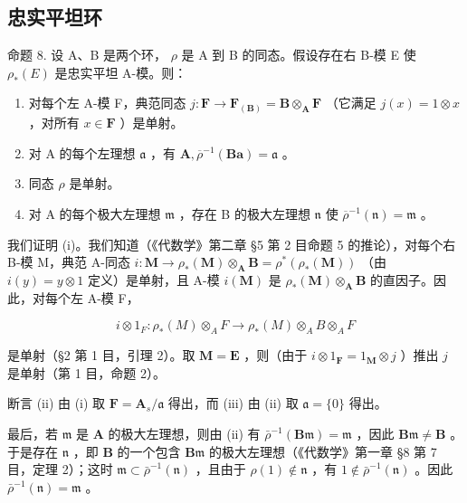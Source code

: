 \subsection{忠实平坦环}

命题 8. 设 A、B 是两个环， \(\rho\) 是 A 到 B 的同态。假设存在右 B-模 E 使 \(\rho_{*}(E)\) 是忠实平坦 A-模。则：

\begin{enumerate}
\def\labelenumi{(\roman{enumi})}
\item
  对每个左 A-模 F，典范同态 \(j: \mathbf{F} \to \mathbf{F}_{(\mathbf{B})} = \mathbf{B} \otimes_{\mathbf{A}} \mathbf{F}\) （它满足 \(j(x) = 1 \otimes x\) ，对所有 \(x \in \mathbf{F}\) ）是单射。
\item
  对 A 的每个左理想 \(\mathfrak{a}\) ，有 \(\mathbf{A},\overline{\rho}^{-1}(\mathbf{Ba}) = \mathfrak{a}\) 。
\item
  同态 \(\rho\) 是单射。
\item
  对 A 的每个极大左理想 \(\mathfrak{m}\) ，存在 B 的极大左理想 \(\mathfrak{n}\) 使 \(\overline{\rho}^{-1}(\mathfrak{n}) = \mathfrak{m}\) 。
\end{enumerate}

我们证明 (i)。我们知道（《代数学》第二章 §5 第 2 目命题 5 的推论），对每个右 B-模 M，典范 A-同态 \(i: \mathbf{M} \to \rho_*(\mathbf{M}) \otimes_{\mathbf{A}} \mathbf{B} = \rho^*(\rho_*(\mathbf{M}))\) （由 \(i(y) = y \otimes 1\) 定义）是单射，且 A-模 \(i(\mathbf{M})\) 是 \(\rho_*(\mathbf{M}) \otimes_{\mathbf{A}} \mathbf{B}\) 的直因子。因此，对每个左 A-模 F，

\[
i \otimes 1 _ {F}: \rho_ {*} (M) \otimes_ {A} F \rightarrow \rho_ {*} (M) \otimes_ {A} B \otimes_ {A} F
\]

是单射（§2 第 1 目，引理 2）。取 \(\mathbf{M} = \mathbf{E}\) ，则（由于 \(i \otimes 1_{\mathbf{F}} = 1_{\mathbf{M}} \otimes j\) ）推出 \(j\) 是单射（第 1 目，命题 2）。

断言 (ii) 由 (i) 取 \(\mathbf{F} = \mathbf{A}_s / \mathfrak{a}\) 得出，而 (iii) 由 (ii) 取 \(\mathfrak{a} = \{0\}\) 得出。

最后，若 \(\mathfrak{m}\) 是 \(\mathbf{A}\) 的极大左理想，则由 (ii) 有 \(\bar{\rho}^{-1}(\mathbf{B}\mathfrak{m}) = \mathfrak{m}\) ，因此 \(\mathbf{B}\mathfrak{m} \neq \mathbf{B}\) 。于是存在 \(\mathfrak{n}\) ，即 \(\mathbf{B}\) 的一个包含 \(\mathbf{B}\mathfrak{m}\) 的极大左理想（《代数学》第一章 §8 第 7 目，定理 2）；这时 \(\mathfrak{m} \subset \bar{\rho}^{-1}(\mathfrak{n})\) ，且由于 \(\rho(1) \notin \mathfrak{n}\) ，有 \(1 \notin \bar{\rho}^{-1}(\mathfrak{n})\) 。因此 \(\bar{\rho}^{-1}(\mathfrak{n}) = \mathfrak{m}\) 。

